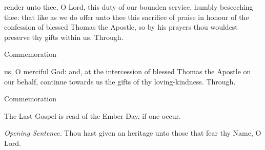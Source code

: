 
\secret
{} render unto thee, O Lord, this duty of our bounden service, humbly beseeching thee: that like as we do offer unto thee this sacrifice of praise in honour of the confession of blessed Thomas the Apostle, so by his prayers thou wouldest preserve thy gifts within us. Through.
\begin{rubric}
    Commemoration %
\end{rubric}


\postcommunion
{} us, O merciful God: and, at the intercession of blessed Thomas the Apostle on our behalf, continue towards us the gifts of thy loving-kindness. Through.
\begin{rubric}
    Commemoration %
\end{rubric}
\begin{rubric}
    The Last Gospel is read of the Ember Day, if one occur.%
\end{rubric}


%
  
\clearpage
{}
\par\noindent
\textit{Opening Sentence.} Thou hast given an heritage unto those that fear thy Name, O Lord.

